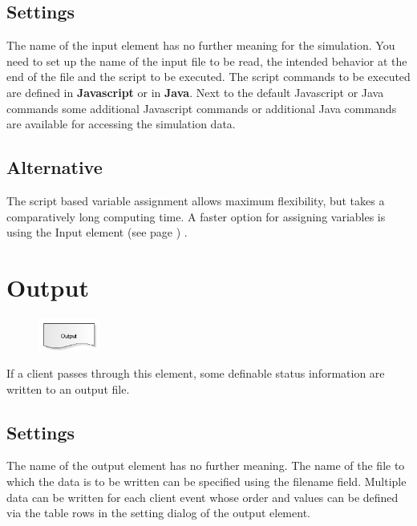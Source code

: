 \subsection*{Settings}

The name of the input element has no further meaning for the simulation.
You need to set up the name of the input file to be read, the intended behavior
at the end of the file and the script to be executed.
The script commands to be executed are defined in \textbf{Javascript} or in \textbf{Java}.
Next to the default Javascript or Java commands some 
additional Javascript commands or
additional Java commands 
are available for accessing the simulation data.

\subsection*{Alternative}

The script based variable assignment allows maximum flexibility, but takes a comparatively long
computing time. A faster option for assigning variables is using the
Input element (see page \pageref{ref:ModelElementInput}) .


\section{Output}
\label{ref:ModelElementOutput}

\begin{figure}
\vspace{-22pt}
\includegraphics[width=2cm]{imageModelElementOutput.png}
\vspace{-22pt}
\end{figure}

If a client passes through this element, some definable status information are written to an output file.

\subsection*{Settings}

The name of the output element has no further meaning. The name of the file to which the data is to be written
can be specified using the filename field. Multiple data can be written for each client event whose order and
values can be defined via the table rows in the setting dialog of the output element.

